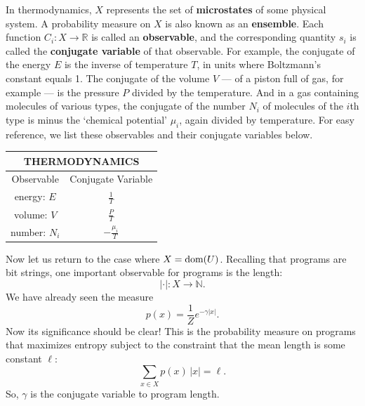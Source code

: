 \documentclass[12pt,twoside,openright]{report}
\newcommand{\maps}{\colon}
\newcommand{\N}{\mathbb{N}}
\newcommand{\R}{\mathbb{R}}
\newcommand{\dom}{\mbox{\rm dom}}
\begin{document}
In thermodynamics, $X$ represents the set of {\bf microstates} of some physical system.  A probability measure on $X$ is also known as an
{\bf ensemble}.  Each function $C_i \maps X \to \R$ is called an {\bf observable}, and the corresponding quantity $s_i$ is called the {\bf conjugate variable} of that observable.  For example, the conjugate of the energy $E$ is the inverse of temperature $T$, in units where Boltzmann's constant equals 1.  The conjugate of the volume $V$ --- of a piston full of gas, for example --- is the pressure $P$ divided by the temperature.  And in a gas containing molecules of various types, the conjugate of the number $N_i$ of molecules of the $i$th type is minus the `chemical potential' $\mu_i$, again divided by temperature. For easy reference, we list these observables and their conjugate variables below.

\begin{center}
\renewcommand{\arraystretch}{2.3}
\begin{tabular}{c|c}  
\multicolumn{2}{c}{\bf{THERMODYNAMICS}} \\
\hline Observable    &  Conjugate Variable\\ 
\hline energy: $E$   &  $\displaystyle{\frac{1}{T}}$ \\
volume: $V$   &  $\displaystyle{\frac{P}{T}}$  \\
number: $N_i$ &  $\displaystyle{-\frac{\mu_i}{T}}$   \\
\end{tabular}
\end{center}
\renewcommand{\arraystretch}{1}

Now let us return to the case where $X=\dom(U)$.  Recalling that programs are bit strings, one important observable for programs is the length:
\[  |\cdot | \maps X \to \N .\]
We have already seen the measure
\[   p(x) = \frac{1}{Z} e^{-\gamma |x|} .\]
Now its significance should be clear!   This is the probability measure on programs that maximizes entropy subject to the constraint that the mean length is some constant $\ell$:
\[    \sum_{x \in X}  p(x) \, |x| = \ell .  \]
So, $\gamma$ is the conjugate variable to program length.
\end{document}
